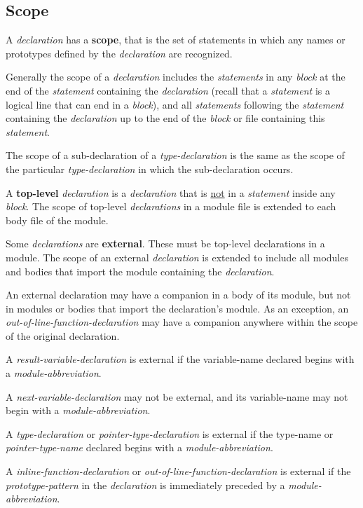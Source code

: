 \documentclass[12pt]{article}
\newcommand{\key}[1]{{\rm \bfseries #1}}
\begin{document}
\subsection{Scope}
\label{SCOPE}

A {\em declaration} has a \key{scope},
that is the set of statements in which any
names or prototypes defined by the {\em declaration}
are recognized.

Generally the scope of a {\em declaration} includes the {\em statements}
in any {\em block} at the end of the {\em statement}
containing the {\em declaration} (recall that a {\em statement} is a
logical line that can end in a {\em block}), and
all {\em statements} following the {\em statement} containing
the {\em declaration} up to the end of the {\em block} or file
containing this {\em statement}.

The scope of a sub-declaration of a {\em type-declaration} is
the same as the scope of the particular {\em type-declaration}
in which the sub-declaration occurs.

A \key{top-level} {\em declaration} is a {\em declaration} that is
\underline{not} in a {\em statement} inside any {\em block}.
The scope of top-level {\em declarations} in a module file is extended
to each body file of the module.

Some {\em declarations} are \key{external}\label{EXTERNAL}.
These must be top-level declarations in a module.
The scope of an external
{\em declaration} is extended to include all modules and bodies that
import the module containing the {\em declaration}.

An external declaration may have a companion in a body of its module,
but not in modules or bodies that import the declaration's module.
As an exception, an
{\em out-of-line-function-declaration} may have a companion
anywhere within the scope of the original declaration.

A {\em result-variable-declaration}
is external if the {variable-name} declared begins with a
{\em module-abbreviation}.

A {\em next-variable-declaration} may not be external, and its
{variable-name} may not begin with a {\em module-abbreviation}.

A {\em type-declaration} or {\em pointer-type-declaration}
is external if the {type-name} or {\em pointer-type-name}
declared begins with a
{\em module-abbreviation}.

A {\em inline-function-declaration} or {\em out-of-line-function-declaration}
is external\label{EXTERNAL-FUNCTION}
if the {\em prototype-pattern} in the {\em declaration}
is immediately preceded by a {\em module-abbreviation}.
\end{document}
